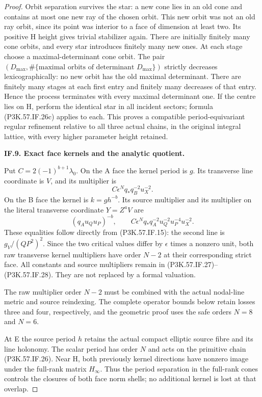 \begin{proof}
Orbit separation survives the star: a new cone lies in
an old cone and contains at most one new ray of the chosen
orbit. This new orbit was not an old ray orbit, since its
point was interior to a face of dimension at least two.
Its positive H height gives trivial stabilizer again.
There are initially finitely many cone orbits, and every
star introduces finitely many new ones. At each stage
choose a maximal-determinant cone orbit. The pair
\((D_{\max},\#\{\text{maximal orbits of determinant }D_{\max}\})\)
strictly decreases lexicographically: no new orbit has
the old maximal determinant. There are finitely many
stages at each first entry and finitely many decreases
of that entry. Hence the process terminates with every
maximal determinant one. If the centre lies on H, perform
the identical star in all incident sectors; formula
(P3K.57.IF.26c) applies to each. This proves a compatible
period-equivariant regular refinement relative to all
three actual chains, in the original integral lattice,
with every higher parameter height retained.

\par\medskip\noindent\textbf{IF.9. Exact face kernels and the analytic quotient.}\par\nopagebreak[4]

Put \(C=2(-1)^{b+1}\lambda_0\). On the A face the kernel period is
\(g\). Its transverse line coordinate is \(V\), and its multiplier is
\[
                  C\epsilon^N q_*q_B^{-2}u_X^{-2}.       \tag{P3K.57.IF.27}
\]
On the B face the kernel is \(k=g h^{-b}\). Its source multiplier
and its multiplier on the literal transverse coordinate \(Y=Z^aV\)
are
\[
 (q_Au_Qu_P)^{-b},\qquad
          C\epsilon^N q_*q_A^{-2}u_Q^{-2}u_P^{-4}u_X^{-2}.       \tag{P3K.57.IF.28}
\]
These equalities follow directly from (P3K.57.IF.15): the second line is
\(g_V/(QP^2)^2\). Since the two critical values differ by
\(\epsilon\) times a nonzero unit, both raw transverse kernel
multipliers have order \(N-2\) at their corresponding strict face.
All constants and source multipliers remain in (P3K.57.IF.27)--\allowbreak (P3K.57.IF.28).
They are not replaced by a formal valuation.

The raw multiplier order \(N-2\) must be combined with the actual nodal-line metric and source reindexing. The complete operator bounds below retain losses three and four, respectively, and the geometric proof uses the safe orders \(N=8\) and \(N=6\).

At E the source period \(h\) retains the actual compact elliptic
source fibre and its line holonomy. The scalar period has order \(N\)
and acts on the primitive chain (P3K.57.IF.26). Near H, both previously
kernel directions have nonzero image under the full-rank matrix
\(H_\infty\). Thus the period separation in the full-rank cones
controls the closures of both face norm shells; no additional
kernel is lost at that overlap.


\end{proof}
